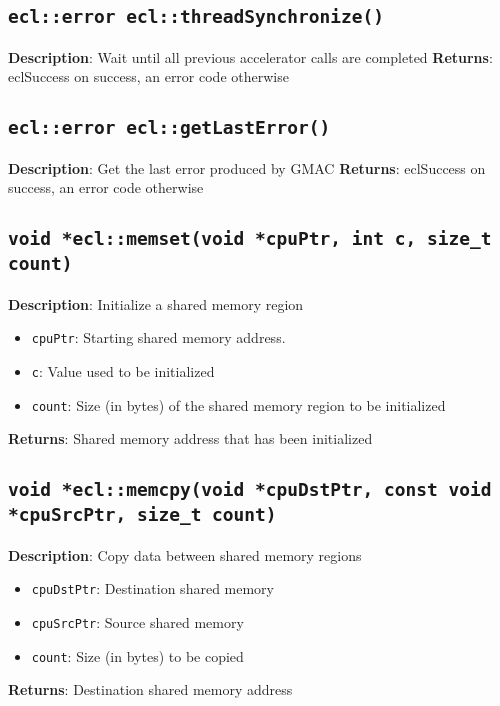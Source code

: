 \subsection{\texttt{ecl::error ecl::threadSynchronize()}}

\textbf{Description}: Wait until all previous accelerator calls are completed
\textbf{Returns}: eclSuccess on success, an error code otherwise

\subsection{\texttt{ecl::error ecl::getLastError()}}

\textbf{Description}: Get the last error produced by GMAC
\textbf{Returns}: eclSuccess on success, an error code otherwise

\subsection{\texttt{void *ecl::memset(void *cpuPtr, int c, size\_t count)}}

\textbf{Description}: Initialize a shared memory region
\begin{itemize}
  \item \texttt{cpuPtr}: Starting shared memory address.
  \item \texttt{c}: Value used to be initialized
  \item \texttt{count}: Size (in bytes) of the shared memory region to be initialized
\end{itemize}
\textbf{Returns}: Shared memory address that has been initialized

\subsection{\texttt{void *ecl::memcpy(void *cpuDstPtr, const void *cpuSrcPtr, size\_t count)}}

\textbf{Description}: Copy data between shared memory regions
\begin{itemize}
  \item \texttt{cpuDstPtr}: Destination shared memory
  \item \texttt{cpuSrcPtr}: Source shared memory
  \item \texttt{count}: Size (in bytes) to be copied
\end{itemize}
\textbf{Returns}: Destination shared memory address

